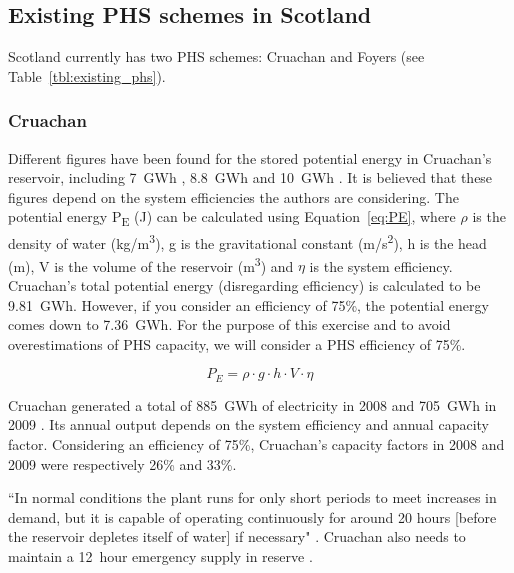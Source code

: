 
\subsection{Existing PHS schemes in Scotland}

Scotland currently has two PHS schemes: Cruachan and Foyers (see Table~\ref{tbl:existing_phs}).





\subsubsection{Cruachan}

Different figures have been found for the stored potential energy in Cruachan's reservoir, including 7~GWh \citep{Strettle2013}, 8.8~GWh \citep{ESMStudy2010} and 10~GWh \citep{MacKayDavid2009}.
It is believed that these figures depend on the system efficiencies the authors are considering.
The potential energy P\textsubscript{E} (J) can be calculated using Equation~\ref{eq:PE}, where $\rho$ is the density of water (kg/m\textsuperscript{3}), g is the gravitational constant (m/s\textsuperscript{2}), h is the head (m), V is the volume of the reservoir (m\textsuperscript{3}) and $\eta$ is the system efficiency.
Cruachan's total potential energy (disregarding efficiency) is calculated to be 9.81~GWh.
However, if you consider an efficiency of 75\%, the potential energy comes down to 7.36~GWh.
For the purpose of this exercise and to avoid overestimations of PHS capacity, we will consider a PHS efficiency of 75\%.

	\begin{equation}\label{eq:PE}
		P_E = \rho \cdot g \cdot h \cdot V \cdot \eta
	\end{equation}

Cruachan generated a total of 885~GWh of electricity in 2008 and 705~GWh in 2009 \citep{ScottishPowernd}.
Its annual output depends on the system efficiency and annual capacity factor.
Considering an efficiency of 75\%, Cruachan's capacity factors in 2008 and 2009 were respectively 26\% and 33\%.

``In normal conditions the plant runs for only short periods to meet increases in demand, but it is capable of operating
continuously for around 20 hours [before the reservoir depletes itself of water] if necessary" \citep{ScottishPowernd, Mearns2018}.
Cruachan also needs to maintain a 12~hour emergency supply in reserve \citep{Mearns2018}.



